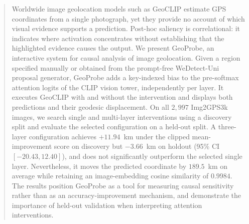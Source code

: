 \begin{abstract}
Worldwide image geolocation models such as GeoCLIP estimate GPS coordinates
from a single photograph, yet they provide no account of which visual evidence
supports a prediction. Post-hoc saliency is correlational: it indicates where
activation concentrates without establishing that the highlighted evidence
causes the output. We present GeoProbe, an interactive system for causal
analysis of image geolocation. Given a region specified manually or obtained
from the prompt-free WeDetect-Uni proposal generator, GeoProbe adds
a key-indexed bias to the pre-softmax attention logits of the CLIP vision
tower, independently per layer. It executes GeoCLIP with and without the
intervention and displays both predictions and their geodesic displacement.
On all $2{,}997$ Img2GPS3k images, we search single and multi-layer
interventions using a discovery split and evaluate the selected configuration
on a held-out split. A three-layer configuration achieves $+11.94$~km under
the clipped mean-improvement score on discovery but $-3.66$~km on holdout
(95\% CI $[-20.43,12.40]$), and does not significantly outperform the
selected single layer. Nevertheless, it moves the predicted coordinate by
$189.5$~km on average while retaining an image-embedding cosine similarity of
$0.9984$. The results position GeoProbe as a tool for measuring causal
sensitivity rather than as an accuracy-improvement mechanism, and demonstrate
the importance of held-out validation when interpreting attention
interventions.

\end{abstract}
